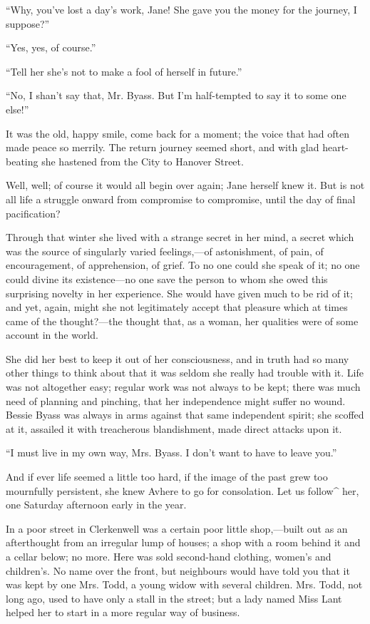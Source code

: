 ``Why, you've lost a day's work, Jane! She gave you the money for the
journey, I suppose?''

``Yes, yes, of course.''

``Tell her she's not to make a fool of herself in future.''

``No, I shan't say that, Mr. Byass. But I'm half-tempted to say it to
some one else!''

It was the old, happy smile, come back for a moment; the voice that had
often made peace so merrily. The return journey seemed short, and with
glad heart-beating she hastened from the City to Hanover Street.

Well, well; of course it would all begin over again; Jane herself knew
it. But is not all life a struggle onward from compromise to compromise,
until the day of final pacification?

Through that winter she lived with a strange secret in her mind, a
secret which was the source of singularly varied feelings,---of
astonishment, of pain, of encouragement, of apprehension, of grief. To
no one could she speak of it; no one could divine its existence---no one
save the person to whom she owed this surprising novelty in her
experience. She would have {}given much to be rid of it; and yet, again,
might she not legitimately accept that pleasure which at times came of
the thought?---the thought that, as a woman, her qualities were of some
account in the world.

She did her best to keep it out of her consciousness, and in truth had
so many other things to think about that it was seldom she really had
trouble with it. Life was not altogether easy; regular work was not
always to be kept; there was much need of planning and pinching, that
her independence might suffer no wound. Bessie Byass was always in arms
against that same independent spirit; she scoffed at it, assailed it
with treacherous blandishment, made direct attacks upon it.

``I must live in my own way, Mrs. Byass. I don't want to have to leave
you.''

And if ever life seemed a little too hard, if the image of the past grew
too mournfully persistent, she knew Avhere to go for consolation. Let us
follow\^{} her, one Saturday afternoon early in the year.

In a poor street in Clerkenwell was a certain poor little shop,---built
out as an afterthought from an irregular lump of houses; a shop with {}a
room behind it and a cellar below; no more. Here was sold second-hand
clothing, women's and children's. No name over the front, but neighbours
would have told you that it was kept by one Mrs. Todd, a young widow
with several children. Mrs. Todd, not long ago, used to have only a
stall in the street; but a lady named Miss Lant helped her to start in a
more regular way of business.

